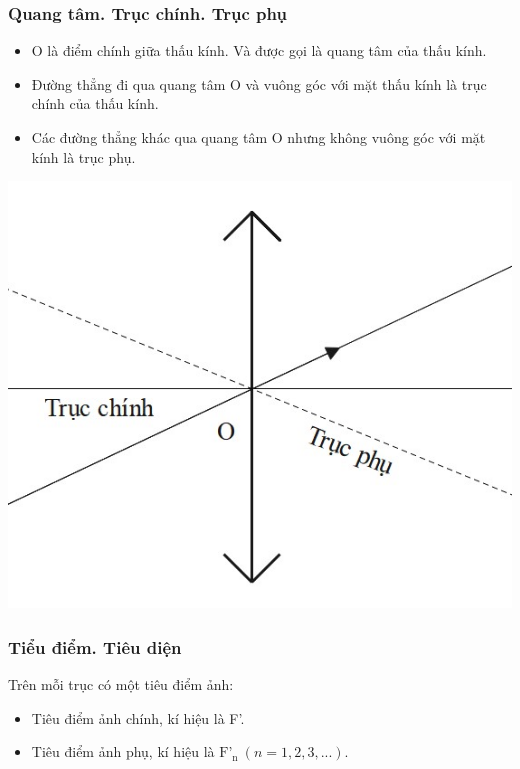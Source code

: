 \subsubsection{Quang tâm. Trục chính. Trục phụ}
\begin{itemize}
	\item O là điểm chính giữa thấu kính. Và được gọi là quang tâm của thấu kính.
	\item Đường thẳng đi qua quang tâm O và vuông góc với mặt thấu kính là trục chính của thấu kính.
	\item Các đường thẳng khác qua quang tâm O nhưng không vuông góc với mặt kính là trục phụ.
	\end{itemize}
\begin{center}
	\includegraphics[scale=0.5]{../figs/VN11-PH-38-L-026-1-h7.jpg}
\end{center}

\subsubsection{Tiểu điểm. Tiêu diện}
Trên mỗi trục có một tiêu điểm ảnh:
\begin{itemize}
	\item Tiêu điểm ảnh chính, kí hiệu là F'. 
	\item Tiêu điểm ảnh phụ, kí hiệu là $\text{F'}_\text{n}\ (n=1,2,3,...)$.
\end{itemize}


